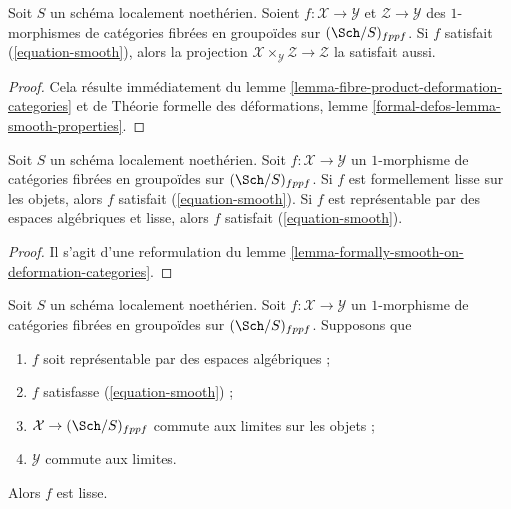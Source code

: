 \begin{lemma}
\label{lemma-base-change-smooth}
Soit $S$ un schéma localement noethérien. Soient
$f : \mathcal{X} \to \mathcal{Y}$ et $\mathcal{Z} \to \mathcal{Y}$ des
$1$-morphismes de catégories fibrées en groupoïdes sur $(\Sch/S)_{fppf}$.
Si $f$ satisfait (\ref{equation-smooth}), alors la projection
$\mathcal{X} \times_\mathcal{Y} \mathcal{Z} \to \mathcal{Z}$ la satisfait aussi.
\end{lemma}

\begin{proof}
Cela résulte immédiatement du lemme
\ref{lemma-fibre-product-deformation-categories} et de Théorie formelle des
déformations, lemme
\ref{formal-defos-lemma-smooth-properties}.
\end{proof}

\begin{lemma}
\label{lemma-smooth-smooth}
Soit $S$ un schéma localement noethérien. Soit
$f : \mathcal{X} \to \mathcal{Y}$ un $1$-morphisme de catégories fibrées en
groupoïdes sur $(\Sch/S)_{fppf}$. Si $f$ est formellement lisse sur les objets,
alors $f$ satisfait (\ref{equation-smooth}). Si $f$ est représentable par des
espaces algébriques et lisse, alors $f$ satisfait (\ref{equation-smooth}).
\end{lemma}

\begin{proof}
Il s'agit d'une reformulation du lemme
\ref{lemma-formally-smooth-on-deformation-categories}.
\end{proof}

\begin{lemma}
\label{lemma-implies-smooth}
Soit $S$ un schéma localement noethérien. Soit
$f : \mathcal{X} \to \mathcal{Y}$ un $1$-morphisme de catégories fibrées en
groupoïdes sur $(\Sch/S)_{fppf}$. Supposons que
\begin{enumerate}
\item $f$ soit représentable par des espaces algébriques ;
\item $f$ satisfasse (\ref{equation-smooth}) ;
\item $\mathcal{X} \to (\Sch/S)_{fppf}$ commute aux limites sur les objets ;
\item $\mathcal{Y}$ commute aux limites.
\end{enumerate}
Alors $f$ est lisse.
\end{lemma}

